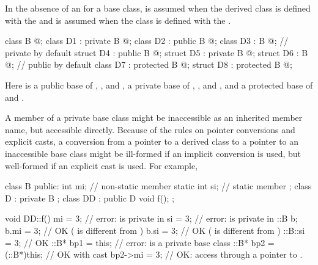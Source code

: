 \pnum
In the absence of an
for a base class,
is assumed when the derived class is
defined with the 
and
is assumed when the class is
defined with the 
.
\begin{example}

\begin{codeblock}
class B { @\commentellip@ };
class D1 : private B { @\commentellip@ };
class D2 : public B { @\commentellip@ };
class D3 : B { @\commentellip@ };             //  private by default
struct D4 : public B { @\commentellip@ };
struct D5 : private B { @\commentellip@ };
struct D6 : B { @\commentellip@ };            //  public by default
class D7 : protected B { @\commentellip@ };
struct D8 : protected B { @\commentellip@ };
\end{codeblock}

Here
is a public base of
,
,
and
,
a private base of
,
,
and
,
and a protected base of
and
.
\end{example}

\pnum
\begin{note}
A member of a private base class might be inaccessible as an inherited
member name, but accessible directly.
Because of the rules on pointer conversions and explicit casts, a conversion from a pointer to a derived class to a pointer
to an inaccessible base class might be ill-formed if an implicit conversion
is used, but well-formed if an explicit cast is used.
For example,

\begin{codeblock}
class B {
public:
  int mi;                       // non-static member
  static int si;                // static member
};
class D : private B {
};
class DD : public D {
  void f();
};

void DD::f() {
  mi = 3;                       // error:  is private in 
  si = 3;                       // error:  is private in 
  ::B  b;
  b.mi = 3;                     // OK ( is different from )
  b.si = 3;                     // OK ( is different from )
  ::B::si = 3;                  // OK
  ::B* bp1 = this;              // error:  is a private base class
  ::B* bp2 = (::B*)this;        // OK with cast
  bp2->mi = 3;                  // OK: access through a pointer to .
}
\end{codeblock}
\end{note}

